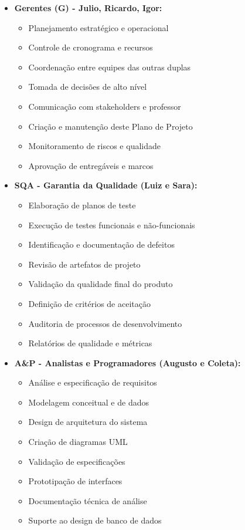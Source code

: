 \begin{itemize}
    \item \textbf{Gerentes (G) - Julio, Ricardo, Igor:} 
    \begin{itemize}
        \item Planejamento estratégico e operacional
        \item Controle de cronograma e recursos
        \item Coordenação entre equipes das outras duplas
        \item Tomada de decisões de alto nível
        \item Comunicação com stakeholders e professor
        \item Criação e manutenção deste Plano de Projeto
        \item Monitoramento de riscos e qualidade
        \item Aprovação de entregáveis e marcos
    \end{itemize}
    
    \item \textbf{SQA - Garantia da Qualidade (Luiz e Sara):}
    \begin{itemize}
        \item Elaboração de planos de teste
        \item Execução de testes funcionais e não-funcionais
        \item Identificação e documentação de defeitos
        \item Revisão de artefatos de projeto
        \item Validação da qualidade final do produto
        \item Definição de critérios de aceitação
        \item Auditoria de processos de desenvolvimento
        \item Relatórios de qualidade e métricas
    \end{itemize}
    
    \item \textbf{A\&P - Analistas e Programadores (Augusto e Coleta):}
    \begin{itemize}
        \item Análise e especificação de requisitos
        \item Modelagem conceitual e de dados
        \item Design de arquitetura do sistema
        \item Criação de diagramas UML
        \item Validação de especificações
        \item Prototipação de interfaces
        \item Documentação técnica de análise
        \item Suporte ao design de banco de dados
    \end{itemize}
    

\end{itemize}
